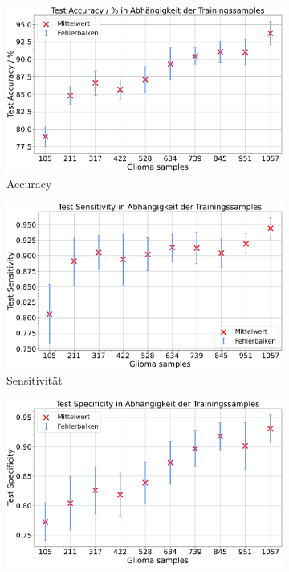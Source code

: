 \begin{figure}[H]
  \centering
  \begin{subfigure}[b]{0.48\textwidth}
    \centering
    \includegraphics[width=\textwidth]{plots/Reduzierung-Gli + Balnce_Accuracy_mean.pdf}
    \caption{Accuracy}
    \label{fig:gli-red-acc}
  \end{subfigure}
  \begin{subfigure}[b]{0.48\textwidth}
    \centering
    \includegraphics[width=\textwidth]{plots/Reduzierung-Gli + Balnce_Sensitivity_mean.pdf}
    \caption{Sensitivität}
    \label{fig:gli-red-sens}
  \end{subfigure}
  \begin{subfigure}[b]{0.48\textwidth}
    \centering
    \includegraphics[width=\textwidth]{plots/Reduzierung-Gli + Balnce_Specificity_mean.pdf}

\end{subfigure}
\end{figure}
